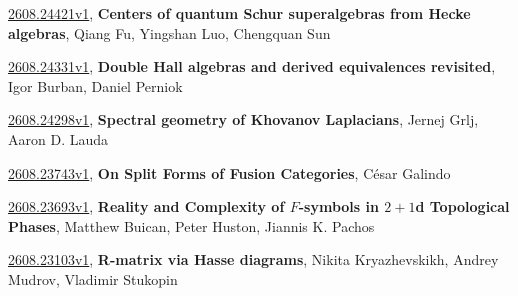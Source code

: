 \documentclass[9pt, a4paper]{article}
\theoremstyle{plain}
\theoremstyle{definition}
\theoremstyle{remark}
\newcommand{\arxiv}[3]{\href{https://arxiv.org/abs/#1}{#1}, \textbf{\textcolor{arxivblue}{#2}}, #3}
\begin{document}
\arxiv{2608.24421v1}{Centers of quantum Schur superalgebras from Hecke algebras}{Qiang Fu, Yingshan Luo, Chengquan Sun}

\arxiv{2608.24331v1}{Double Hall algebras and derived equivalences revisited}{Igor Burban, Daniel Perniok}

\arxiv{2608.24298v1}{Spectral geometry of Khovanov Laplacians}{Jernej Grlj, Aaron D. Lauda}

\arxiv{2608.23743v1}{On Split Forms of Fusion Categories}{César Galindo}

\arxiv{2608.23693v1}{Reality and Complexity of $F$-symbols in $2+1$d Topological Phases}{Matthew Buican, Peter Huston, Jiannis K. Pachos}

\arxiv{2608.23103v1}{R-matrix via Hasse diagrams}{Nikita Kryazhevskikh, Andrey Mudrov, Vladimir Stukopin}

\end{document}
